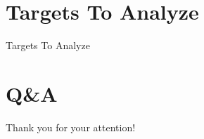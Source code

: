 \documentclass[accentcolor=tud8b,colorbacktitle,inverttitle,landscape,presentation,t]{tudbeamer}
\begin{document}
\section{Targets To Analyze}

\begin{frame}{\insertsection}
	Targets To Analyze
\end{frame}


\section{Q\&A}
\begin{frame}{\insertsection}
	\vspace*{\fill}
	\centering
	\huge{Thank you for your attention!}%
	\vspace*{\fill}
\end{frame}
\end{document}
